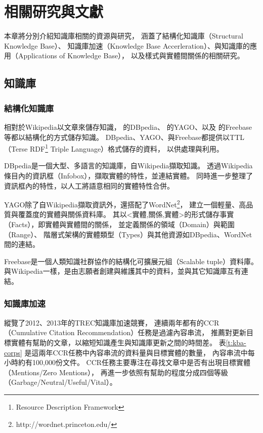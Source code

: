 %
%
%
\chapter{相關研究與文獻}
\label{c:related}

本章將分別介紹知識庫相關的資源與研究，
涵蓋了結構化知識庫（Structural Knowledge Base）、
知識庫加速（Knowledge Base Accerleration）、與知識庫的應用（Applications of Knowledge Base），
以及樣式與實體間關係的相關研究。

\section{知識庫}
\subsection{結構化知識庫}
相對於Wikipedia以文章來儲存知識，\cite{dbpedia} 的DBpedia、
\cite{yago} 的YAGO、以及\cite{freebase} 的Freebase等都以結構化的方式儲存知識。
DBpedia、YAGO、與Freebase都提供以TTL（Terse RDF\footnote{Resource Description Framework} Triple Language）格式儲存的資料，
以供處理與利用。

DBpedia是一個大型、多語言的知識庫，自Wikipedia擷取知識。
透過Wikipedia條目內的資訊框（Infobox），擷取實體的特性，並連結實體。
同時進一步整理了資訊框內的特性，以人工將語意相同的實體特性合併。

YAGO除了自Wikipedia擷取資訊外，還搭配了WordNet\footnote{http://wordnet.princeton.edu/}，
建立一個輕量、高品質與覆蓋度的實體與關係資料庫。
其以<實體,關係,實體>的形式儲存事實（Facts），即實體與實體間的關係，
並定義關係的領域（Domain）與範圍（Range）、
階層式架構的實體類型（Types）與其他資源如DBpedia、WordNet間的連結。

Freebase是一個人類知識社群協作的結構化可擴展元組（Scalable tuple）資料庫。
與Wikipedia一樣，是由志願者創建與維護其中的資料，並與其它知識庫互有連結。

\subsection{知識庫加速}

\cite{kba2012,kba2013}縱覽了2012、2013年的TREC知識庫加速競賽，
連續兩年都有的CCR（Cumulative Citation Recommendation）任務是過濾內容串流，
推薦對更新目標實體有幫助的文章，以縮短知識產生與知識庫更新之間的時間差。
表\ref{t:kba-corps} 是這兩年CCR任務中內容串流的資料量與目標實體的數量，
內容串流中每小時約有100,000份文件。
CCR任務主要專注在尋找文章中是否有出現目標實體（Mentions/Zero Mentions），
再進一步依照有幫助的程度分成四個等級（Garbage/Neutral/Useful/Vital）。


